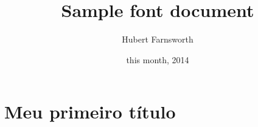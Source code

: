 \documentclass{memoir}
\title{Sample font document}
\author{Hubert Farnsworth}
\date{this month, 2014}
\begin{document}
 

\maketitle
 

\chapter*{Meu primeiro título}

 
\end{document}
